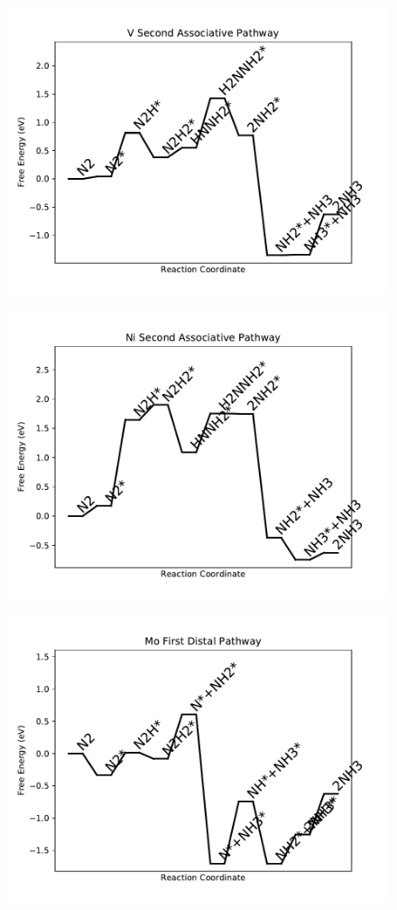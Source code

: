 \begin{figure}
\includegraphics[width=0.8\linewidth]{data/plots/V_associative_2.pdf}
\label{fig:V_associative_2}
\end{figure}

\begin{figure}
\includegraphics[width=0.8\linewidth]{data/plots/Ni_associative_2.pdf}
\label{fig:Ni_associative_2}
\end{figure}

\begin{figure}
\includegraphics[width=0.8\linewidth]{data/plots/Mo_distal_1.pdf}
\label{fig:Mo_distal_1}
\end{figure}

